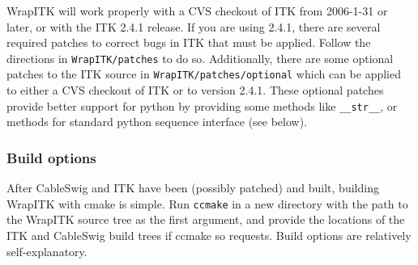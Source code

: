 \documentclass{InsightArticle}
\begin{document}
WrapITK will work properly with a CVS checkout of ITK from 2006-1-31 or later,
or with the ITK 2.4.1 release. If you are using 2.4.1, there are several
required patches to correct bugs in ITK that must be applied. Follow the
directions in \verb$WrapITK/patches$ to do so. Additionally, there are some optional
patches to the ITK source in \verb$WrapITK/patches/optional$ which can be applied to
either a CVS checkout of ITK or to version 2.4.1. These optional patches provide
better support for python by providing some methods like \verb$__str__$, or methods
for standard python sequence interface (see below).

    \subsubsection{Build options}

After CableSwig and ITK have been (possibly patched) and built, building WrapITK
with cmake is simple. Run \verb$ccmake$ in a new directory with the path to the WrapITK
source tree as the first argument, and provide the locations of the ITK and
CableSwig build trees if ccmake so requests. Build options are relatively
self-explanatory.
\end{document}
